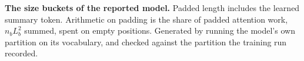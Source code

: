 \begin{table}[t]
\centering
\caption[Size buckets]{\textbf{The size buckets of the reported model.}
Padded length includes the learned summary token. Arithmetic on padding is
the share of padded attention work, $n_b L_b^2$ summed, spent on empty
positions. Generated by running the model's own partition on its
vocabulary, and checked against the partition the training run recorded.}
\label{stab:buckets}
\small

\end{table}
